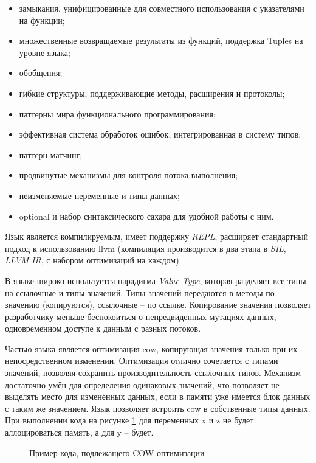 \begin{itemize}
	\item замыкания, унифицированные для совместного использования с указателями на функции;
	\item множественные возвращаемые результаты из функций, поддержка Tuples на уровне языка;
	\item обобщения;
	\item гибкие структуры, поддерживающие методы, расширения и протоколы;
	\item паттерны мира функционального программирования;
	\item эффективная система обработок ошибок, интегрированная в систему типов;
	\item паттерн матчинг;
	\item продвинутые механизмы для контроля потока выполнения;
	\item неизменяемые переменные и типы данных;
	\item optional и набор синтаксического сахара для удобной работы с ним.
\end{itemize}

Язык является компилируемым, имеет поддержку \textit{REPL}, расширяет стандартный подход к использованию \gls{llvm} (компиляция производится в два этапа в \textit{SIL}, \textit{LLVM IR}, с набором оптимизаций на каждом).

В языке широко используется парадигма \textit{Value Type}, которая разделяет все типы на ссылочные и типы значений. Типы значений передаются в методы по значению (копируются), ссылочные -- по ссылке. Копирование значения позволяет разработчику меньше беспокоиться о непредвиденных мутациях данных, одновременном доступе к данным с разных потоков.

Частью языка является оптимизация \gls{cow}, копирующая значения только при их непосредственном изменении. Оптимизация отлично сочетается с типами значений, позволяя сохранить производительность ссылочных типов. Механизм достаточно умён для определения одинаковых значений, что позволяет не выделять место для изменённых данных, если в памяти уже имеется блок данных с таким же значением. Язык позволяет встроить \gls{cow} в собственные типы данных. При выполнении кода на рисунке \ref{sec:development:arch:ios:swift:code:cow} для переменных x и z не будет аллоцироваться память, а для y -- будет.

\begin{figure}[h]
	
   \caption{Пример кода, подлежащего COW оптимизации}
   \label{sec:development:arch:ios:swift:code:cow}
\end{figure}

